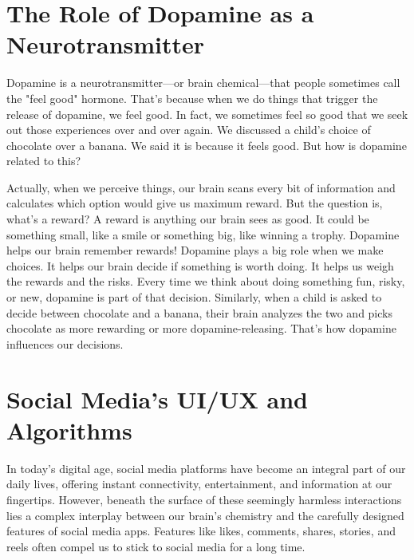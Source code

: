 \documentclass[a4paper,10pt,twocolumn]{memoir}
\begin{document}
{{{{{{\section*{The Role of Dopamine as a Neurotransmitter}

Dopamine is a neurotransmitter—or brain chemical—that people sometimes call the "feel good" hormone. That's because when we do things that trigger the release of dopamine, we feel good. In fact, we sometimes feel so good that we seek out those experiences over and over again. We discussed a child’s choice of chocolate over a banana. We said it is because it feels good. But how is dopamine related to this?

Actually, when we perceive things, our brain scans every bit of information and calculates which option would give us maximum reward. But the question is, what’s a reward? A reward is anything our brain sees as good. It could be something small, like a smile or something big, like winning a trophy. Dopamine helps our brain remember rewards! Dopamine plays a big role when we make choices. It helps our brain decide if something is worth doing. It helps us weigh the rewards and the risks. Every time we think about doing something fun, risky, or new, dopamine is part of that decision. Similarly, when a child is asked to decide between chocolate and a banana, their brain analyzes the two and picks chocolate as more rewarding or more dopamine-releasing. That’s how dopamine influences our decisions.

\section*{Social Media’s UI/UX and Algorithms}

In today’s digital age, social media platforms have become an integral part of our daily lives, offering instant connectivity, entertainment, and information at our fingertips. However, beneath the surface of these seemingly harmless interactions lies a complex interplay between our brain’s chemistry and the carefully designed features of social media apps. Features like likes, comments, shares, stories, and reels often compel us to stick to social media for a long time.


}}}}}}
\end{document}

